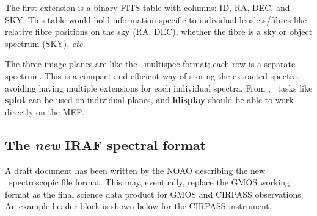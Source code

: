\documentclass[twoside,11pt]{article}
\newcommand{\htmladdnormallink}[2]{#1}
\newcommand{\htmlref}[2]{#1}
\newcommand{\xlabel}[1]{}
\begin{document}
The first extension is a binary FITS table with columns: ID, RA, DEC,
and SKY.  This table would hold information specific to individual
lenslets/fibres like relative fibre positions on the sky (RA, DEC),
whether the fibre is a sky or object spectrum (SKY), \emph{etc.}

The three image planes are like the \IRAF\
\htmladdnormallink{multispec
format}{http://iraf.noao.edu/iraf/docs/specwcs.ps.Z}; each row is a
separate spectrum.  This is a compact and efficient way of storing the
extracted spectra, avoiding having multiple extensions for each
individual spectra.  From \IRAF, \ONEDSPEC\ tasks like {\bf splot} can
be used on individual planes, and {\bf ldisplay} should be able to work
directly on the MEF.

\subsection{\xlabel{sc16_iraf}The {\em new} IRAF spectral format\label{sc16_iraf}}

A draft document has been written by the NOAO describing the new
\IRAFref\ \htmladdnormallink{spectroscopic file
format}{http://iraf.noao.edu/projects/ccdmosaic/imagedef/spec2d.html}.
This may, eventually, replace the GMOS \htmlref{working
format}{sc16_gmos} as the final science data product for
\htmlref{GMOS}{sc16_gmos} and \htmlref{CIRPASS}{sc16_cirpass}
observations.  An example header block is shown below for the CIRPASS
instrument.
\end{document}
